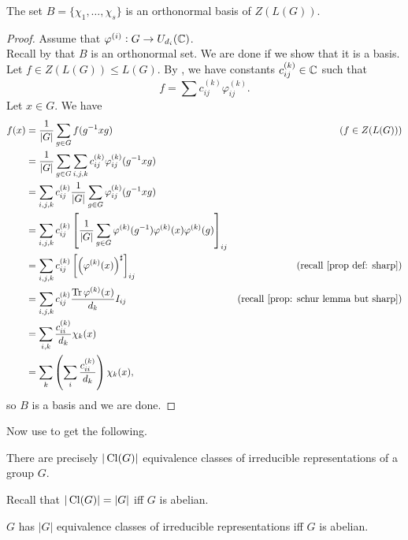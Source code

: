 		\begin{fprop}
			\label{cor: orthonormal basis of ZLG}
			The set $B = \{\chi_1 , \ldots, \chi_s\}$ is an orthonormal basis of $Z(L(G))$.
		\end{fprop}
		\begin{proof}
			Assume that $\varphi^{(i)} : G \to U_{d_i}(\mathbb{C})$.\\
			Recall by  that $B$ is an orthonormal set. We are done if we show that it is a basis. Let $f \in Z(L(G)) \le L(G)$. By , we have constants $c_{ij}^{(k)} \in \mathbb{C}$ such that
			\[ f = \sum c_{ij}^{(k)} \varphi_{ij}^{(k)}. \]
			Let $x \in G$. We have
			\begin{align*}
				f(x) &= \frac{1}{|G|} \sum_{g \in G} f(g^{-1}xg) & (f \in Z(L(G))) \\
					&= \frac{1}{|G|} \sum_{g \in G} \sum_{i,j,k} c_{ij}^{(k)} \varphi_{ij}^{(k)}(g^{-1}xg) \\
					&= \sum_{i,j,k} c_{ij}^{(k)} \frac{1}{|G|} \sum_{g \in G} \varphi_{ij}^{(k)}(g^{-1}xg) \\
					&= \sum_{i,j,k} c_{ij}^{(k)} \left[\frac{1}{|G|} \sum_{g \in G} \varphi^{(k)}(g^{-1})\varphi^{(k)}(x)\varphi^{(k)}(g)\right]_{ij} \\
					&= \sum_{i,j,k} c_{ij}^{(k)} \left[\left(\varphi^{(k)}(x)\right)^\sharp\right]_{ij} & (\text{recall \Cref{prop def: sharp}}) \\
					&= \sum_{i,j,k} c_{ij}^{(k)} \frac{\Tr \varphi^{(k)}(x)}{d_k} I_{ij} & (\text{recall \Cref{prop: schur lemma but sharp}}) \\
					&= \sum_{i,k} \frac{c_{ii}^{(k)}}{d_k} \chi_k(x) \\
					&= \sum_k \left( \sum_i \frac{c_{ii}^{(k)}}{d_k} \right) \chi_k(x),
			\end{align*}
			so $B$ is a basis and we are done.
		\end{proof}

		Now use  to get the following.

		\begin{fcor}
			\label{cor: number of irred reps is conjug}
			There are precisely $|\operatorname{Cl}(G)|$ equivalence classes of irreducible representations of a group $G$.
		\end{fcor}

		Recall that $|\operatorname{Cl}(G)| = |G|$ iff $G$ is abelian.

		\begin{fcor}
			\label{cor: equivalence classes of irreds for abelian}
			$G$ has $|G|$ equivalence classes of irreducible representations iff $G$ is abelian.
		\end{fcor}

